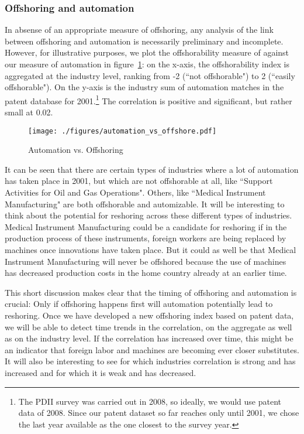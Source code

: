 \documentclass[11pt,a4paper]{article}
\begin{document}
\subsubsection*{Offshoring and automation}

In absense of an appropriate measure of offshoring, any analysis of the link between offshoring and automation is necessarily preliminary and incomplete. However, for illustrative purposes, we plot the offshorability measure of \cite{BK2013} against our measure of automation in figure~\ref{fig:offshoring_vs_automation}: on the x-axis, the offshorability index is aggregated at the industry level, ranking from -2 (``not offshorable") to 2 (``easily offshorable"). On the y-axis is the industry sum of automation matches in the patent database for 2001.\footnote{The PDII survey was carried out in 2008, so ideally, we would use patent data of 2008. Since our patent dataset so far reaches only until 2001, we chose the last year available as the one closest to the survey year.} The correlation is positive and significant, but rather small at 0.02.

\begin{figure}
	\centering
	\caption{Automation vs. Offshoring}
	\label{fig:offshoring_vs_automation}
	\texttt{[image: ./figures/automation\_vs\_offshore.pdf]}
\end{figure}

It can be seen that there are certain types of industries where a lot of automation has taken place in 2001, but which are not offshorable at all, like ``Support Activities for Oil and Gas Operations". Others, like ``Medical Instrument Manufacturing" are both offshorable and automizable. It will be interesting to think about the potential for reshoring across these different types of industries. Medical Instrument Manufacturing could be a candidate for reshoring if in the production process of these instruments, foreign workers are being replaced by machines once innovations have taken place. But it could as well be that Medical Instrument Manufacturing will never be offshored because the use of machines has decreased production costs in the home country already at an earlier time.

This short discussion makes clear that the timing of offshoring and automation is crucial: Only if offshoring happens first will automation potentially lead to reshoring. Once we have developed a new offshoring index based on patent data, we will be able to detect time trends in the correlation, on the aggregate as well as on the industry level. If the correlation has increased over time, this might be an indicator that foreign labor and machines are becoming ever closer substitutes. It will also be interesting to see for which industries correlation is strong and has increased and for which it is weak and has decreased.
\end{document}

